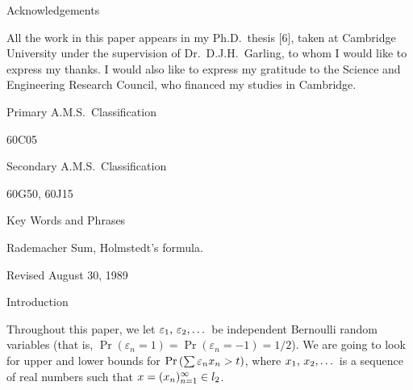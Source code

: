 \beginsection Acknowledgements

All the work in this paper appears in my Ph.D.\ thesis [6], taken at
Cambridge University under the supervision of Dr.~D.J.H.~Garling, to
whom I would like to express my thanks. I would also like to express my
gratitude to the Science and Engineering Research Council, who financed
my studies in Cambridge.

\beginsection Primary A.M.S.\ Classification

60C05

\beginsection Secondary A.M.S.\ Classification

60G50, 60J15

\beginsection Key Words and Phrases

Rademacher Sum, Holmstedt's formula.

\bigskip\bigskip

\centerline{Revised August 30, 1989}

\vfill
\eject

\beginsection Introduction

Throughout this paper, we let $\epsilonlist$\ be independent Bernoulli
random variables (that is, $\Pr(\varepsilon_n=1) =
\Pr(\varepsilon_n=-1) = 1/2$).
We are going to look for upper and lower bounds for
$\Pr\left(\sum \varepsilon_n x_n > t \right)$, where $\xlist$\ is a sequence of real numbers such
that $x = (x_n)_{n=1}^\infty \in l_2$.

